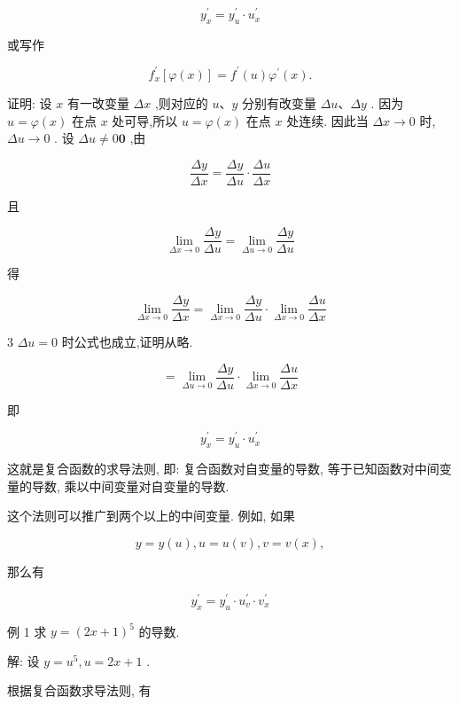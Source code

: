 \documentclass[lang=cn,newtx,10pt,scheme=chinese]{elegantbook}
\begin{document}
\[
{y}_{x}^{\prime } = {y}_{u}^{\prime } \cdot {u}_{x}^{\prime }
\]

或写作

\[
{f}_{x}^{\prime }\left\lbrack {\varphi \left( x\right) }\right\rbrack = {f}^{\prime }\left( u\right) {\varphi }^{\prime }\left( x\right) .
\]

证明: 设 \(x\) 有一改变量 \({\Delta x}\) ,则对应的 \(u\text{、}y\) 分别有改变量 \({\Delta u}\text{、}{\Delta y}\) . 因为 \(u = \varphi \left( x\right)\) 在点 \(x\) 处可导,所以 \(u = \varphi \left( x\right)\) 在点 \(x\) 处连续. 因此当 \({\Delta x} \rightarrow 0\) 时, \({\Delta u} \rightarrow 0\) . 设 \({\Delta u} \neq 0\mathbf{0}\) ,由

\[
\frac{\Delta y}{\Delta x} = \frac{\Delta y}{\Delta u} \cdot \frac{\Delta u}{\Delta x}
\]

且

\[
\mathop{\lim }\limits_{{{\Delta x} \rightarrow 0}}\frac{\Delta y}{\Delta u} = \mathop{\lim }\limits_{{{\Delta u} \rightarrow 0}}\frac{\Delta y}{\Delta u}
\]

得

\[
\mathop{\lim }\limits_{{{\Delta x} \rightarrow 0}}\frac{\Delta y}{\Delta x} = \mathop{\lim }\limits_{{{\Delta x} \rightarrow 0}}\frac{\Delta y}{\Delta u} \cdot \mathop{\lim }\limits_{{{\Delta x} \rightarrow 0}}\frac{\Delta u}{\Delta x}
\]

3 \({\Delta u} = 0\) 时公式也成立,证明从略.

\[
= \mathop{\lim }\limits_{{{\Delta u} \rightarrow 0}}\frac{\Delta y}{\Delta u} \cdot \mathop{\lim }\limits_{{{\Delta x} \rightarrow 0}}\frac{\Delta u}{\Delta x}
\]

即

\[
{y}_{x}^{\prime } = {y}_{u}^{\prime } \cdot {u}_{x}^{\prime }
\]

这就是复合函数的求导法则, 即: 复合函数对自变量的导数, 等于已知函数对中间变量的导数, 乘以中间变量对自变量的导数.

这个法则可以推广到两个以上的中间变量. 例如, 如果

\[
y = y\left( u\right) ,u = u\left( v\right) ,v = v\left( x\right) ,
\]

那么有

\[
{y}_{x}^{\prime } = {y}_{u}^{\prime } \cdot {u}_{v}^{\prime } \cdot {v}_{x}^{\prime }
\]

例 1 求 \(y = {\left( 2x + 1\right) }^{5}\) 的导数.

解: 设 \(y = {u}^{5},u = {2x} + 1\) .

根据复合函数求导法则, 有
\end{document}
